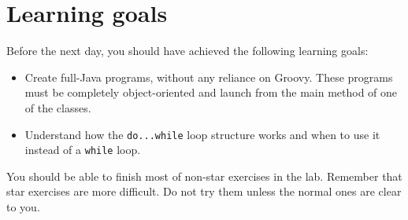 \documentclass{article}
\begin{document}
\section*{Learning goals}
\label{sec:learning-goals}

Before the next day, you should have achieved the following learning
goals: 

\begin{itemize}
\item Create full-Java programs, without any reliance on Groovy. These
  programs must be completely object-oriented and launch from the main
  method of one of the classes.
\item Understand how the \verb+do...while+ loop structure works and
  when to use it instead of a \verb+while+ loop. 
\end{itemize}

You should be able to finish most of non-star exercises in the
lab. Remember that star exercises are more difficult. Do not try them
unless the normal ones are clear to you. 
\end{document}

